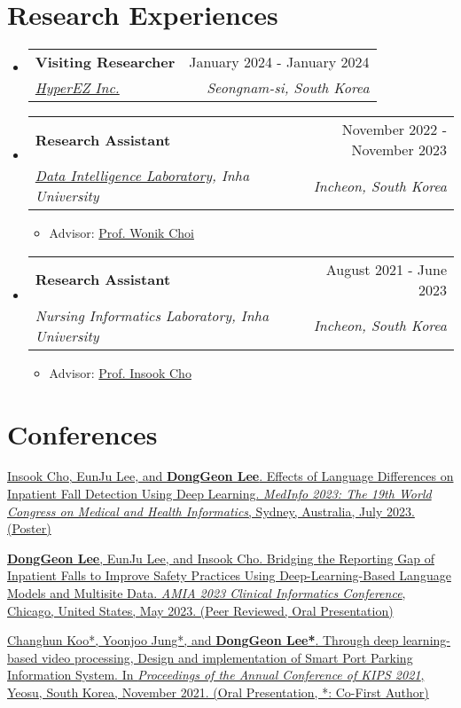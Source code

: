 \documentclass[letterpaper,11pt]{article}
\makeatletter
\newcommand{\resumeSubheading}[4]{
  \vspace{-1pt}\item
    \begin{tabular*}{0.97\textwidth}{l@{\extracolsep{\fill}}r}
      #1 & #2 \\
      \textit{\small#3} & \textit{\small #4} \\
    \end{tabular*}\vspace{-5pt}
}
\makeatother
\begin{document}
    \section{Research Experiences}
    \begin{itemize}[leftmargin=*,label=]
        \resumeSubheading
        {\textbf{Visiting Researcher}}{January 2024 - January 2024}
            {\href{https://www.hyperez.io/?lang=en}{HyperEZ Inc.}}{Seongnam-si, South Korea}
        \resumeSubheading
        {\textbf{Research Assistant} }{November 2022 - November 2023}
            {\href{http://dilab.inha.ac.kr/}{Data Intelligence Laboratory}, Inha University}{Incheon, South Korea}
            \begin{itemize}[label=\bullet]
                \item{Advisor: \href{http://bit.ly/3zSrQ8F}{Prof. Wonik Choi}}
            \end{itemize}
        \resumeSubheading
        {\textbf{Research Assistant}}{August 2021 - June 2023}
            {Nursing Informatics Laboratory, Inha University}{Incheon, South Korea}
            \begin{itemize}[label=\bullet]
                \item{Advisor: \href{http://bit.ly/412nYOw}{Prof. Insook Cho}}
            \end{itemize}
    \end{itemize}

        
    \section{Conferences}
    \begin{enumerate}[noitemsep, leftmargin=*,label={[\arabic*]}]
        \item \href{https://bit.ly/medinfo2023poster}{Insook Cho, EunJu Lee, and \textbf{DongGeon Lee}. Effects of Language Differences on Inpatient Fall Detection Using Deep Learning. \textit{MedInfo 2023: The 19th World Congress on Medical and Health Informatics}, Sydney, Australia, July 2023. (Poster)}
        
        \item \href{https://bit.ly/cic23abstract}{\textbf{DongGeon Lee}, EunJu Lee, and Insook Cho. Bridging the Reporting Gap of Inpatient Falls to Improve Safety Practices Using Deep-Learning-Based Language Models and Multisite Data. \textit{AMIA 2023 Clinical Informatics Conference}, Chicago, United States, May 2023. (Peer Reviewed, Oral Presentation)}
        
        \item {\href{https://doi.org/10.3745/PKIPS.y2021m11a.1342}{Changhun Koo*, Yoonjoo Jung*, and \textbf{DongGeon Lee*}. Through deep learning-based video processing, Design and implementation of Smart Port Parking Information System. In \textit{Proceedings of the Annual Conference of KIPS 2021}, Yeosu, South Korea, November 2021. (Oral Presentation, *: Co-First Author)}}
    \end{enumerate}
\end{document}
